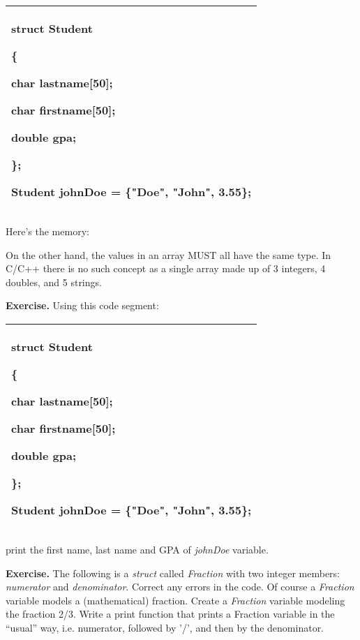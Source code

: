 \documentclass[
]{article}
\begin{document}
\begin{longtable}[]{@{}l@{}}
\toprule
\endhead
\begin{minipage}[t]{0.97\columnwidth}\raggedright
struct Student

\{

char lastname{[}50{]};

char firstname{[}50{]};

double gpa;

\};

Student johnDoe = \{"Doe", "John", 3.55\};\strut
\end{minipage}\tabularnewline
\bottomrule
\end{longtable}

Here's the memory:

On the other hand, the values in an array MUST all have the same type.
In C/C++ there is no such concept as a single array made up of 3
integers, 4 doubles, and 5 strings.

\textbf{Exercise. }Using this code segment:

\begin{longtable}[]{@{}l@{}}
\toprule
\endhead
\begin{minipage}[t]{0.97\columnwidth}\raggedright
struct Student

\{

char lastname{[}50{]};

char firstname{[}50{]};

double gpa;

\};

Student johnDoe = \{"Doe", "John", 3.55\};\strut
\end{minipage}\tabularnewline
\bottomrule
\end{longtable}

print the first name, last name and GPA of \emph{johnDoe} variable.

\textbf{Exercise.} The following is a \emph{struct} called
\emph{Fraction} with two integer members: \emph{numerator} and
\emph{denominator}. Correct any errors in the code. Of course a
\emph{Fraction} variable models a (mathematical) fraction. Create a
\emph{Fraction} variable modeling the fraction 2/3. Write a print
function that prints a Fraction variable in the ``usual'' way, i.e.
numerator, followed by '/', and then by the denominator.
\end{document}
